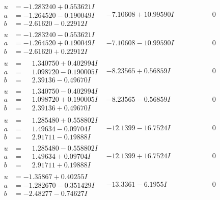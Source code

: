 \documentclass[1p]{elsarticle_modified}
\theoremstyle{definition}
\begin{document}
$$\begin{array}{c|c|c}
\begin{aligned}
u &= -1.283240 + 0.553621 I \\
a &= -1.264520 - 0.190049 I \\
b &= -2.61620 - 0.22912 I\end{aligned}
 & -7.10608 + 10.99590 I & \phantom{-0.000000 } 0 \\ \hline\begin{aligned}
u &= -1.283240 - 0.553621 I \\
a &= -1.264520 + 0.190049 I \\
b &= -2.61620 + 0.22912 I\end{aligned}
 & -7.10608 - 10.99590 I & \phantom{-0.000000 } 0 \\ \hline\begin{aligned}
u &= \phantom{-}1.340750 + 0.402994 I \\
a &= \phantom{-}1.098720 - 0.190005 I \\
b &= \phantom{-}2.39136 - 0.49670 I\end{aligned}
 & -8.23565 + 0.56859 I & \phantom{-0.000000 } 0 \\ \hline\begin{aligned}
u &= \phantom{-}1.340750 - 0.402994 I \\
a &= \phantom{-}1.098720 + 0.190005 I \\
b &= \phantom{-}2.39136 + 0.49670 I\end{aligned}
 & -8.23565 - 0.56859 I & \phantom{-0.000000 } 0 \\ \hline\begin{aligned}
u &= \phantom{-}1.285480 + 0.558802 I \\
a &= \phantom{-}1.49634 - 0.09704 I \\
b &= \phantom{-}2.91711 - 0.19888 I\end{aligned}
 & -12.1399 - 16.7524 I & \phantom{-0.000000 } 0 \\ \hline\begin{aligned}
u &= \phantom{-}1.285480 - 0.558802 I \\
a &= \phantom{-}1.49634 + 0.09704 I \\
b &= \phantom{-}2.91711 + 0.19888 I\end{aligned}
 & -12.1399 + 16.7524 I & \phantom{-0.000000 } 0 \\ \hline\begin{aligned}
u &= -1.35867 + 0.40255 I \\
a &= -1.282670 - 0.351429 I \\
b &= -2.48277 - 0.74627 I\end{aligned}
 & -13.3361 - 6.1955 I & \phantom{-0.000000 } 0\\

\end{array}$$
\end{document}
